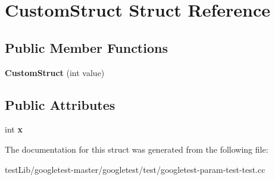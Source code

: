 \hypertarget{structCustomStruct}{}\section{Custom\+Struct Struct Reference}
\label{structCustomStruct}
\subsection*{Public Member Functions}
\begin{DoxyCompactItemize}
\item 
\mbox{\label{structCustomStruct_aeab194957ba9e056e81c721e83c61941}} 
{\bfseries Custom\+Struct} (int value)
\end{DoxyCompactItemize}
\subsection*{Public Attributes}
\begin{DoxyCompactItemize}
\item 
\mbox{\label{structCustomStruct_a436b0c2ffdab1f711fa40cfa3e246602}} 
int {\bfseries x}
\end{DoxyCompactItemize}


The documentation for this struct was generated from the following file\+:\begin{DoxyCompactItemize}
\item 
test\+Lib/googletest-\/master/googletest/test/googletest-\/param-\/test-\/test.\+cc\end{DoxyCompactItemize}
